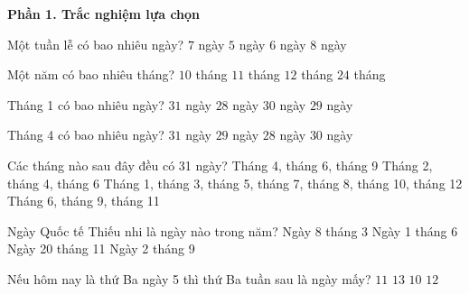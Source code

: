 \textbf{Phần 1. Trắc nghiệm lựa chọn}

\begin{ex} %
Một tuần lễ có bao nhiêu ngày?
\choice
{\True $7$ ngày}
{$5$ ngày}
{$6$ ngày}
{$8$ ngày}
\end{ex}

\begin{ex} %
Một năm có bao nhiêu tháng?
\choice
{$10$ tháng}
{$11$ tháng}
{\True $12$ tháng}
{$24$ tháng}
\end{ex}

\begin{ex} %
Tháng 1 có bao nhiêu ngày?
\choice
{\True $31$ ngày}
{$28$ ngày}
{$30$ ngày}
{$29$ ngày}
\end{ex}

\begin{ex} %
Tháng 4 có bao nhiêu ngày?
\choice
{$31$ ngày}
{$29$ ngày}
{$28$ ngày}
{\True $30$ ngày}
\end{ex}

\begin{ex} %
Các tháng nào sau đây đều có 31 ngày?
\choice
{Tháng 4, tháng 6, tháng 9}
{Tháng 2, tháng 4, tháng 6}
{\True Tháng 1, tháng 3, tháng 5, tháng 7, tháng 8, tháng 10, tháng 12}
{Tháng 6, tháng 9, tháng 11}
\end{ex}

\begin{ex} %
Ngày Quốc tế Thiếu nhi là ngày nào trong năm?
\choice
{Ngày 8 tháng 3}
{\True Ngày 1 tháng 6}
{Ngày 20 tháng 11}
{Ngày 2 tháng 9}
\end{ex}

\begin{ex} %
Nếu hôm nay là thứ Ba ngày 5 thì thứ Ba tuần sau là ngày mấy?
\choice
{$11$}
{$13$}
{$10$}
{\True $12$}
\end{ex}

